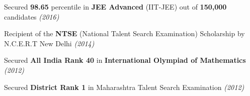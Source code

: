 \begin{cventries}
  \cventry
    {}
    {}
    {}
    {}
    { 
    \vspace{-5mm}
      \begin{cvitems}
        \item {Secured \textbf{98.65} percentile in \textbf{JEE Advanced} (IIT-JEE) out of {\bf 150,000} candidates\hfill \fontsize{9pt}{1em} \slshape\color{darkgray} (2016)}\vspace{0.3mm}
        \item{Recipient of the \textbf{NTSE} (National Talent Search Examination) Scholarship by N.C.E.R.T New Delhi \hfill \fontsize{9pt}{1em} \slshape\color{darkgray} (2014)}\vspace{0.3mm}
        \item{Secured \textbf{All India Rank 40} in \textbf{International Olympiad of Mathematics} \hfill\fontsize{9pt}{1em} \slshape\color{darkgray} (2012)}\vspace{0.3mm}
        \item{Secured \textbf{District Rank 1} in Maharashtra Talent Search Examination \hfill\fontsize{9pt}{1em} \slshape\color{darkgray} (2012)}
      \end{cvitems} 
    }
\end{cventries}

